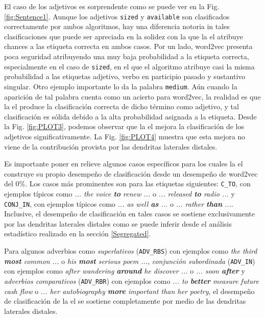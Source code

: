 {El caso de los adjetivos es sorprendente como se puede ver en la Fig. \ref{fig:Sentence1}.
Aunque los adjetivos \texttt{sized} y \texttt{available} son clasificados correctamente por ambos algoritmos, hay una diferencia notoria in tales clasificaciones que puede ser apreciada en la solidez con la que la \gls{el} atribuye chances a las etiqueta correcta en ambos casos.
Por un lado, word2vec presenta poca seguridad atribuyendo una muy baja probabilidad a la etiqueta correcta, especialmente en el caso de \texttt{sized}, en el que el algoritmo atribuye casi la misma probabilidad a las etiquetas adjetivo, verbo en participio pasado y sustantivo singular.
Otro ejemplo importante lo da la palabra \texttt{medium}.
Aún cuando la aparición de tal palabra cuenta como un acierto para word2vec, la realidad es que la \gls{el} produce la clasificación correcta de dicho término como adjetivo, y tal clasificación es sólida debido a la alta probabilidad asignada a la etiqueta.
Desde la Fig. \ref{fig:PLOT3}, podemos observar que la \gls{el} mejora la clasificación de los adjetivos significativamente.
La Fig. \ref{fig:PLOT4} muestra que esta mejora no viene de la contribución provista por las dendritas laterales distales.

Es importante poner en relieve algunos casos específicos para los cuales la \gls{el} construye su propio desempeño de clasificación desde un desempeño de word2vec del 0\%.
Los casos más prominentes son para las etiquetas siguientes:
\texttt{C\_TO}, con ejemplos típicos como \emph{... the voice \textbf{to} renew ...} o \emph{... released \textbf{to} radio ...} y
\texttt{CONJ\_IN}, con ejemplos típicos como \emph{... as well \textbf{as} ...} o \emph{... rather \textbf{than} ...}.
Inclusive, el desempeño de clasificación en tales casos se sostiene exclusivamente por las dendritas laterales distales como se puede inferir desde el análisis estadístico realizado en la sección \ref{Segregated}.

Para algunos adverbios como
\emph{superlativos} (\texttt{ADV\_RBS}) con ejemplos como \emph{the third \textbf{most} common ...} o \emph{his \textbf{most} serious poem ...}, \emph{conjunción subordinada} (\texttt{ADV\_IN}) con ejemplos como \emph{after wandering \textbf{around} he discover ...} o \emph{... soon \textbf{after}} y \emph{adverbios comparativos} (\texttt{ADV\_RBR}) con ejemplos como \emph{... to \textbf{better} measure future cash flow} o \emph{... her autobiography \textbf{more} important than her poetry}, el desempeño de clasificación de la \gls{el} se sostiene completamente por medio de las dendritas laterales distales.

}
